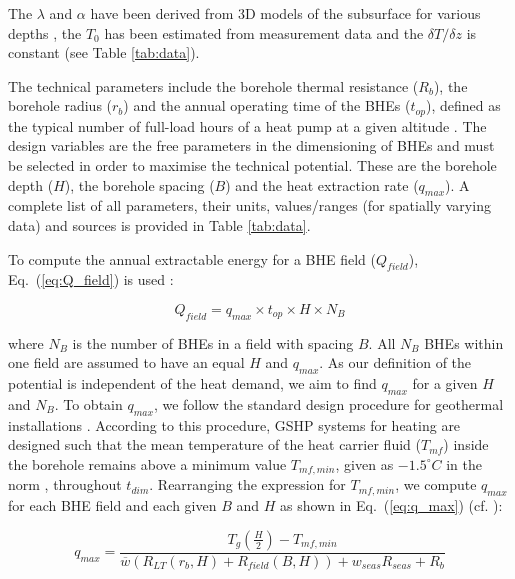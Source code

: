 The $\lambda$ and $\alpha$ have been derived from 3D models of the subsurface for various depths \cite{asit_vd_cadastre_2019-1, sitg_cadastre_2019}, the $T_0$ has been estimated from measurement data \cite{assouline_machine_2019} and the $\delta T/\delta z$ is constant (see Table \ref{tab:data}).

The technical parameters include the borehole thermal resistance ($R_b$), the borehole radius ($r_b$) and the annual operating time of the BHEs ($t_{op}$), defined as the typical number of full-load hours of a heat pump at a given altitude \cite{sia_sondes_2010}. 
The design variables are the free parameters in the dimensioning of BHEs and must be selected in order to maximise the technical potential. 
These are the borehole depth ($H$), the borehole spacing ($B$) and the heat extraction rate ($q_{max}$). 
A complete list of all parameters, their units, values/ranges (for spatially varying data) and sources is provided in Table \ref{tab:data}.  

To compute the annual extractable energy for a BHE field ($Q_{field}$), Eq.~(\ref{eq:Q_field}) is used \cite{pahud_geothermal_2002}:

\begin{equation}
\label{eq:Q_field}
    Q_{field}=q_{max} \times t_{op} \times H \times N_B
\end{equation}

where $N_B$ is the number of BHEs in a field with spacing $B$. All $N_B$ BHEs within one field are assumed to have an equal $H$ and $q_{max}$.
As our definition of the potential is independent of the heat demand, we aim to find $q_{max}$ for a given $H$ and $N_B$.
To obtain $q_{max}$, we follow the standard design procedure for geothermal installations \cite{kavanaugh_geothermal_2014, spitler_vertical_2016, pahud_geothermal_2002}. 
According to this procedure, GSHP systems for heating are designed such that the mean temperature of the heat carrier fluid ($T_{mf}$) inside the borehole remains above a minimum value $T_{mf, min}$, given as $-1.5 ^\circ C$ in the norm \cite{sia_sondes_2010}, throughout $t_{dim}$. 
Rearranging the expression for $T_{mf, min}$, we compute $q_{max}$ for each BHE field and each given $B$ and $H$ as shown in Eq.~(\ref{eq:q_max}) (cf. \cite{pahud_geothermal_2002}):

\begin{equation}
\label{eq:q_max}
    q_{max} = \frac{T_g(\frac{H}{2}) - T_{mf, min}}{\overline{w}(R_{LT}(r_b, H) + R_{field}(B, H)) + w_{seas} R_{seas} + R_b}
\end{equation}


